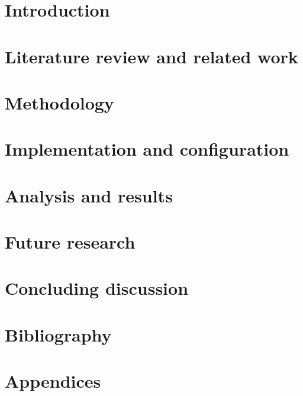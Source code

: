 \documentclass{article}
\newcommand\importsection[2]{
 \section{#1}
 
}
\begin{document}





\importsection{Introduction}{./sections/introduction.tex} %
\importsection{Literature review and related work}{./sections/literature.tex} %
\importsection{Methodology}{./sections/methodology.tex} %
\importsection{Implementation and configuration}{./sections/impl_and_conf.tex} %
\importsection{Analysis and results}{./sections/analysis_and_rslt.tex} %
\importsection{Future research}{./sections/future_research.tex} %
\importsection{Concluding discussion}{./sections/concluding_disc.tex} %
\importsection{Bibliography}{./sections/bibliography.tex} %
\importsection{Appendices}{./sections/appendices.tex} %
\end{document}
